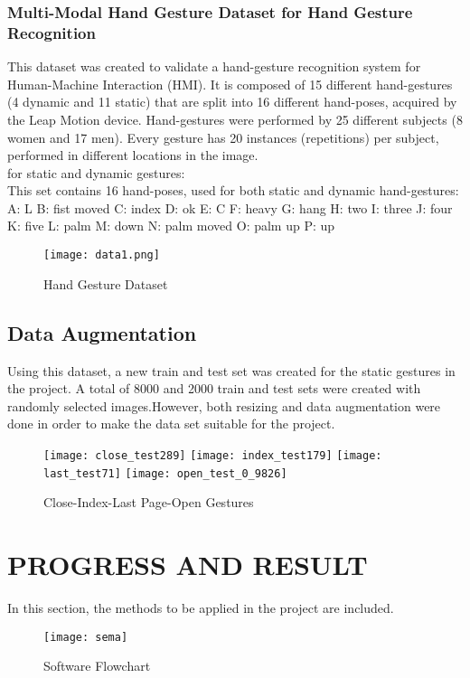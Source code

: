 \documentclass[thesis]{deutez}
\begin{document}
\subsection{Multi-Modal Hand Gesture Dataset for Hand Gesture Recognition}
This dataset was created to validate a hand-gesture recognition system for Human-Machine Interaction (HMI). It is composed of 15 different hand-gestures (4 dynamic and 11 static) that are split into 16 different hand-poses, acquired by the Leap Motion device. Hand-gestures were performed by 25 different subjects (8 women and 17 men). Every gesture has 20 instances (repetitions) per subject, performed in different locations in the image.\cite{dataset}\\
for static and dynamic gestures:\\
This set contains 16 hand-poses, used for both static and dynamic hand-gestures:\\
A: L
B: fist moved
C: index
D: ok
E: C
F: heavy
G: hang
H: two
I: three
J: four
K: five
L: palm
M: down
N: palm moved
O: palm up
P: up
\begin{figure}[h!]
	\centering
	\texttt{[image: data1.png]}
	\caption{Hand Gesture Dataset}
\end{figure}
\FloatBarrier
\section{Data Augmentation}
Using this dataset, a new train and test set was created for the static gestures in the project. A total of 8000 and 2000 train and test sets were created with randomly selected images.However, both resizing and data augmentation were done in order to make the data set suitable for the project.\cite{aug}

\begin{figure}[h!]
	\centering
	\texttt{[image: close\_test289]}
	\texttt{[image: index\_test179]}
	\texttt{[image: last\_test71]}
	\texttt{[image: open\_test\_0\_9826]}
	\caption{Close-Index-Last Page-Open Gestures}
\end{figure}
\FloatBarrier

\chapter{PROGRESS AND RESULT}
In this section, the methods to be applied in the project are included.

\begin{figure}[h!]
	\centering
	\texttt{[image: sema]}
	\caption{Software Flowchart}
\end{figure}
\FloatBarrier
\end{document}
